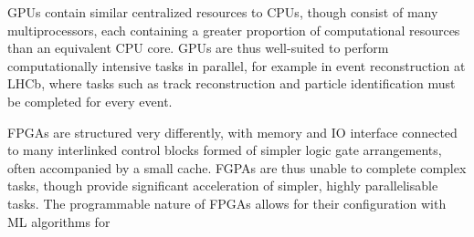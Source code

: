 GPUs contain similar centralized resources to CPUs, though consist of many multiprocessors, each containing a greater proportion of computational resources than an equivalent CPU core. GPUs are thus well-suited to perform computationally intensive tasks in parallel, for example in event reconstruction at LHCb, where tasks such as track reconstruction and particle identification must be completed for every event. \cite{vomBruch-gpus} \par
FPGAs are structured very differently, with memory and IO interface connected to many interlinked control blocks formed of simpler logic gate arrangements, often accompanied by a small cache. FGPAs are thus unable to complete complex tasks, though provide significant acceleration of simpler, highly parallelisable tasks. The programmable nature of FPGAs allows for their configuration with ML algorithms for \cite{duarte-fpgas, muons-fpgas}  \par